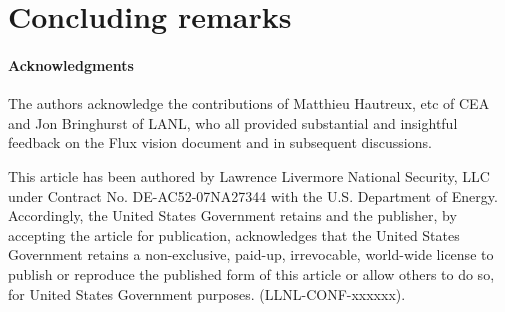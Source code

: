 \section{Concluding remarks}



\paragraph{Acknowledgments}
The authors acknowledge the contributions of Matthieu Hautreux, etc
of CEA and Jon Bringhurst of LANL, who all provided substantial
and insightful feedback on the Flux vision document and in subsequent
discussions.

This article has been authored by Lawrence Livermore National Security, LLC
under Contract No. DE-AC52-07NA27344 with the U.S. Department of
Energy. Accordingly, the United States Government retains and the publisher,
by accepting the article for publication, acknowledges that the United States
Government retains a non-exclusive, paid-up, irrevocable, world-wide license
to publish or reproduce the published form of this article or allow others to
do so, for United States Government purposes. (LLNL-CONF-xxxxxx).
